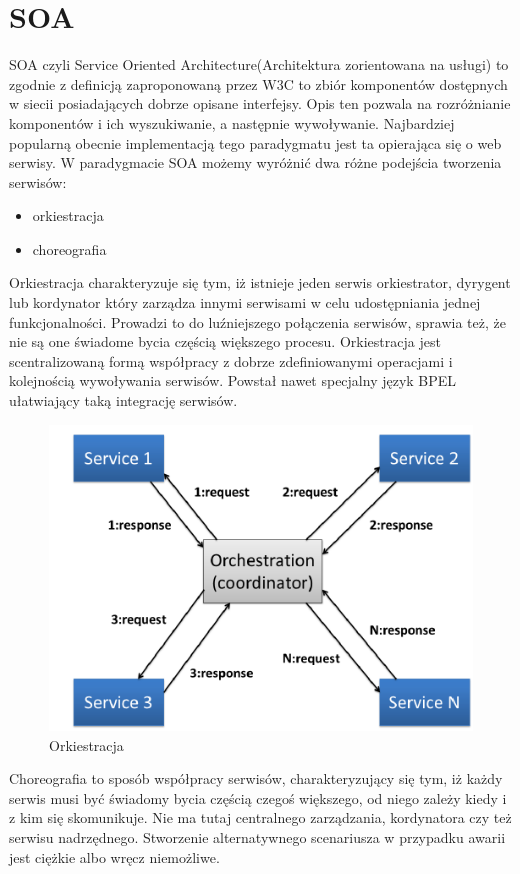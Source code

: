 \section{SOA}
SOA czyli Service Oriented Architecture(Architektura zorientowana na usługi) to zgodnie z definicją zaproponowaną przez W3C to zbiór komponentów dostępnych w siecii posiadających dobrze opisane interfejsy. Opis ten pozwala na rozróżnianie komponentów i ich wyszukiwanie, a następnie wywoływanie. Najbardziej popularną obecnie implementacją tego paradygmatu jest ta opierająca się o web serwisy.  W paradygmacie SOA możemy wyróżnić dwa różne podejścia tworzenia serwisów:
 \begin{itemize}
	\item orkiestracja
	\item choreografia
\end{itemize}  
Orkiestracja charakteryzuje się tym, iż istnieje jeden serwis orkiestrator, dyrygent lub kordynator który zarządza innymi serwisami w celu udostępniania jednej funkcjonalności. Prowadzi to do luźniejszego połączenia serwisów, sprawia też, że nie są one świadome bycia częścią większego procesu. Orkiestracja jest scentralizowaną formą współpracy z dobrze zdefiniowanymi operacjami i kolejnością wywoływania serwisów. Powstał nawet specjalny język BPEL ułatwiający taką integrację serwisów.   
\begin{figure}[!h]
	\centering
	\includegraphics[scale=0.75]{orkiestracja.png} 
	\caption{Orkiestracja}
\end{figure}
\newpage
Choreografia to sposób współpracy serwisów, charakteryzujący się tym,  iż każdy serwis musi być świadomy bycia częścią czegoś większego, od niego zależy kiedy i z kim się skomunikuje. Nie ma tutaj centralnego zarządzania, kordynatora czy też serwisu nadrzędnego. Stworzenie alternatywnego scenariusza w przypadku awarii jest ciężkie albo wręcz niemożliwe. 

